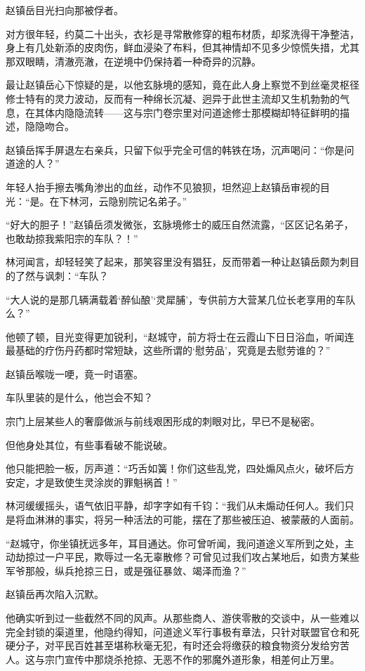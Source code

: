 赵镇岳目光扫向那被俘者。

对方很年轻，约莫二十出头，衣衫是寻常散修穿的粗布材质，却浆洗得干净整洁，身上有几处新添的皮肉伤，鲜血浸染了布料，但其神情却不见多少惊慌失措，尤其那双眼睛，清澈亮澈，在逆境中仍保持着一种奇异的沉静。

最让赵镇岳心下惊疑的是，以他玄脉境的感知，竟在此人身上察觉不到丝毫灵枢径修士特有的灵力波动，反而有一种绵长沉凝、迥异于此世主流却又生机勃勃的气息，在其体内隐隐流转——这与宗门卷宗里对问道途修士那模糊却特征鲜明的描述，隐隐吻合。

赵镇岳挥手屏退左右亲兵，只留下似乎完全可信的韩铁在场，沉声喝问：“你是问道途的人？”

年轻人抬手擦去嘴角渗出的血丝，动作不见狼狈，坦然迎上赵镇岳审视的目光：“是。在下林河，云隐别院记名弟子。”

“好大的胆子！”赵镇岳须发微张，玄脉境修士的威压自然流露，“区区记名弟子，也敢劫掠我紫阳宗的车队？！”

林河闻言，却轻轻笑了起来，那笑容里没有猖狂，反而带着一种让赵镇岳颇为刺目的了然与讽刺：“车队？

“大人说的是那几辆满载着‘醉仙酿’‘灵犀脯’，专供前方大营某几位长老享用的车队么？”

他顿了顿，目光变得更加锐利，“赵城守，前方将士在云霞山下日日浴血，听闻连最基础的疗伤丹药都时常短缺，这些所谓的‘慰劳品’，究竟是去慰劳谁的？”

赵镇岳喉咙一哽，竟一时语塞。

车队里装的是什么，他岂会不知？

宗门上层某些人的奢靡做派与前线艰困形成的刺眼对比，早已不是秘密。

但他身处其位，有些事看破不能说破。

他只能把脸一板，厉声道：“巧舌如簧！你们这些乱党，四处煽风点火，破坏后方安定，才是致使生灵涂炭的罪魁祸首！”

林河缓缓摇头，语气依旧平静，却字字如有千钧：“我们从未煽动任何人。我们只是将血淋淋的事实，将另一种活法的可能，摆在了那些被压迫、被蒙蔽的人面前。

“赵城守，你坐镇抚远多年，耳目通达。你可曾听闻，我问道途义军所到之处，主动劫掠过一户平民，欺辱过一名无辜散修？可曾见过我们攻占某地后，如贵方某些军爷那般，纵兵抢掠三日，或是强征暴敛、竭泽而渔？”

赵镇岳再次陷入沉默。

他确实听到过一些截然不同的风声。从那些商人、游侠零散的交谈中，从一些难以完全封锁的渠道里，他隐约得知，问道途义军行事极有章法，只针对联盟官仓和死硬分子，对平民百姓甚至堪称秋毫无犯，有时还会将缴获的粮食物资分发给穷苦人。这与宗门宣传中那烧杀抢掠、无恶不作的邪魔外道形象，相差何止万里。

